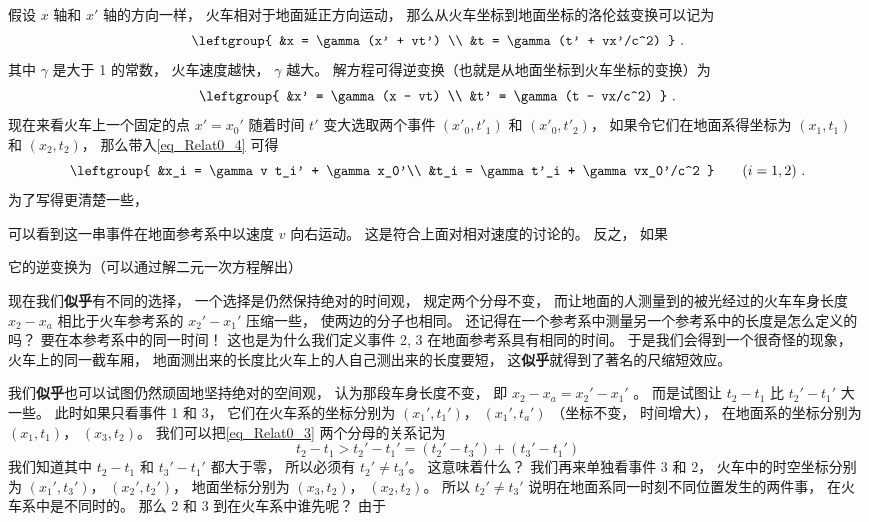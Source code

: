假设 $x$ 轴和 $x'$ 轴的方向一样， 火车相对于地面延正方向运动， 那么从火车坐标到地面坐标的洛伦兹变换可以记为
\begin{equation}\label{eq_Relat0_4}
\leftgroup{
&x = \gamma (x' + vt') \\
&t = \gamma (t' + vx'/c^2)
}~.
\end{equation}
其中 $\gamma$ 是大于 1 的常数， 火车速度越快， $\gamma$ 越大。 解方程可得逆变换（也就是从地面坐标到火车坐标的变换）为
\begin{equation}
\leftgroup{
&x' = \gamma (x - vt) \\
&t' = \gamma (t - vx/c^2)
}~.
\end{equation}
现在来看火车上一个固定的点 $x' = x_0'$ 随着时间 $t'$ 变大选取两个事件 $(x'_0, t'_1)$ 和 $(x'_0, t'_2)$， 如果令它们在地面系得坐标为 $(x_1, t_1)$ 和 $(x_2, t_2)$， 那么带入\autoref{eq_Relat0_4} 可得
\begin{equation}
\leftgroup{
&x_i = \gamma v t_i' + \gamma x_0'\\
&t_i = \gamma t'_i + \gamma vx_0'/c^2
} \qquad (i = 1,2)~.
\end{equation}
为了写得更清楚一些，

可以看到这一串事件在地面参考系中以速度 $v$ 向右运动。 这是符合上面对相对速度的讨论的。 反之， 如果


它的逆变换为（可以通过解二元一次方程解出）







现在我们\textbf{似乎}有不同的选择， 一个选择是仍然保持绝对的时间观， 规定两个分母不变， 而让地面的人测量到的被光经过的火车车身长度 $x_2 - x_a$ 相比于火车参考系的 $x_2'-x_1'$ 压缩一些， 使两边的分子也相同。 还记得在一个参考系中测量另一个参考系中的长度是怎么定义的吗？ 要在本参考系中的同一时间！ 这也是为什么我们定义事件 2, 3 在地面参考系具有相同的时间。 于是我们会得到一个很奇怪的现象， 火车上的同一截车厢， 地面测出来的长度比火车上的人自己测出来的长度要短， 这\textbf{似乎}就得到了著名的尺缩短效应。

我们\textbf{似乎}也可以试图仍然顽固地坚持绝对的空间观， 认为那段车身长度不变， 即 $x_2 - x_a = x_2' - x_1'$ 。 而是试图让 $t_2 - t_1$ 比 $t_2' - t_1'$ 大一些。 此时如果只看事件 1 和 3， 它们在火车系的坐标分别为 $(x_1', t_1')$， $(x_1', t_a')$ （坐标不变， 时间增大）， 在地面系的坐标分别为 $(x_1, t_1)$， $(x_3, t_2)$。 我们可以把\autoref{eq_Relat0_3} 两个分母的关系记为
\begin{equation}
t_2 - t_1 > t_2' - t_1' = (t_2' - t_3') + (t_3' - t_1')
\end{equation}
我们知道其中 $t_2 - t_1$ 和 $t_3' - t_1'$ 都大于零， 所以必须有 $t_2' \ne t_3'$。 这意味着什么？ 我们再来单独看事件 3 和 2， 火车中的时空坐标分别为 $(x_1', t_3')$， $(x_2', t_2')$， 地面坐标分别为 $(x_3, t_2)$， $(x_2, t_2)$。 所以 $t_2' \ne t_3'$ 说明在地面系同一时刻不同位置发生的两件事， 在火车系中是不同时的。 那么 2 和 3 到在火车系中谁先呢？ 由于 
